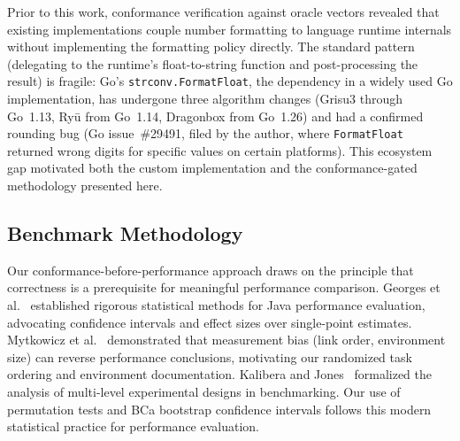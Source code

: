 Prior to this work, conformance verification against \ecma oracle
vectors revealed that existing \rfcjcs implementations couple number
formatting to language runtime internals without implementing the \ecma
formatting policy directly.  The standard pattern (delegating to the
runtime's float-to-string function and post-processing the result) is
fragile: Go's \texttt{strconv.FormatFloat}, the dependency in a widely
used Go \rfcjcs implementation, has undergone three
algorithm changes (Grisu3 through Go~1.13, Ry\=u from Go~1.14,
Dragonbox from Go~1.26) and had a confirmed rounding bug (Go
issue~\#29491, filed by the \rfcjcs author, where \texttt{FormatFloat}
returned wrong digits for specific values on certain platforms).  This
ecosystem gap motivated both the custom implementation and the
conformance-gated methodology presented here.

\subsection{Benchmark Methodology}

Our conformance-before-performance approach draws on the principle that
correctness is a prerequisite for meaningful performance comparison.
Georges et al.~\cite{georges2007statistically} established rigorous
statistical methods for Java performance evaluation, advocating
confidence intervals and effect sizes over single-point estimates.
Mytkowicz et al.~\cite{mytkowicz2009producing} demonstrated that
measurement bias (link order, environment size) can reverse performance
conclusions, motivating our randomized task ordering and environment
documentation.  Kalibera and Jones~\cite{kalibera2013rigorous} formalized
the analysis of multi-level experimental designs in benchmarking.  Our
use of permutation tests and BCa bootstrap confidence intervals follows
this modern statistical practice for performance evaluation.
